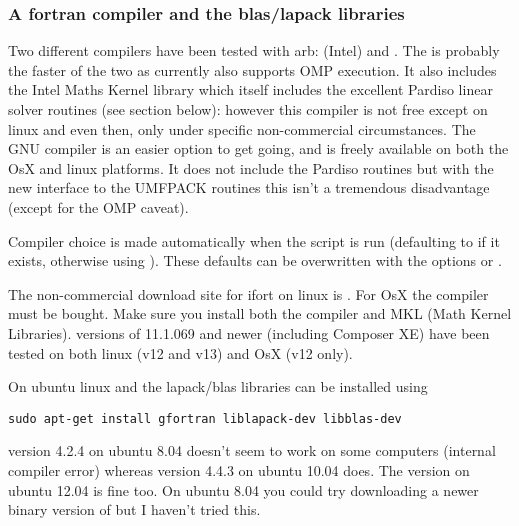 \subsubsection{A fortran compiler and the blas/lapack libraries \label{sec:compiler}}

Two different compilers have been tested with arb:  (Intel) and .  The   is probably the faster of the two as currently also supports OMP execution.  It also includes the Intel Maths Kernel library which itself includes the excellent Pardiso linear solver routines (see section \label{sec:pardiso} below):  however this compiler is not free except on linux and even then, only under specific non-commercial circumstances.  The GNU compiler  is an easier option to get going, and is freely available on both the OsX and linux platforms.  It does not include the Pardiso routines but with the new interface to the UMFPACK routines this isn't a tremendous disadvantage (except for the OMP caveat).

Compiler choice is made automatically when the  script is run (defaulting to  if it exists, otherwise using ).  These defaults can be overwritten with the  options  or .


The non-commercial download site for ifort on linux is .  For OsX the compiler must be bought.  Make sure you install both the compiler and MKL (Math Kernel Libraries).   versions of 11.1.069 and newer (including Composer XE) have been tested on both linux (v12 and v13) and OsX (v12 only).


On ubuntu linux  and the lapack/blas libraries can be installed using
%
\begin{verbatim}
sudo apt-get install gfortran liblapack-dev libblas-dev
\end{verbatim}
%
 version 4.2.4 on ubuntu 8.04 doesn't seem to work on some computers (internal compiler error) whereas version 4.4.3 on ubuntu 10.04 does.  The version on ubuntu 12.04 is fine too.  On ubuntu 8.04 you could try downloading a newer binary version of  but I haven't tried this.

